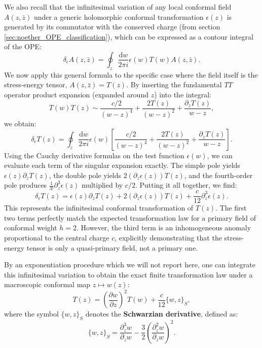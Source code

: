 We also recall that the infinitesimal variation of any local conformal field \(A(z, \bar{z})\) under a generic holomorphic conformal transformation \(\epsilon(z)\) is generated by its commutator with the conserved charge (from section \ref{sec:noether_OPE_classification}), which can be expressed as a contour integral of the OPE:
\[
    \delta_\epsilon A(z, \bar{z}) = \oint_z \frac{\mathrm{d} w}{2\pi i} \epsilon(w) T(w) A(z, \bar{z}).
\]
We now apply this general formula to the specific case where the field itself is the stress-energy tensor, \(A(z, \bar{z}) = T(z)\). By inserting the fundamental \(TT\) operator product expansion (expanded around \(z\)) into the integral:
\[
    T(w)T(z) \sim \frac{c/2}{(w - z)^4} + \frac{2T(z)}{(w - z)^2} + \frac{\partial_z T(z)}{w - z},
\]
we obtain:
\[
    \delta_\epsilon T(z) = \oint_z \frac{\mathrm{d} w}{2\pi i} \epsilon(w) \left[ \frac{c/2}{(w - z)^4} + \frac{2T(z)}{(w - z)^2} + \frac{\partial_z T(z)}{w - z} \right].
\]
Using the Cauchy derivative formulas on the test function \(\epsilon(w)\), we can evaluate each term of the singular expansion exactly. The simple pole yields \(\epsilon(z) \partial_z T(z)\), the double pole yields \(2 (\partial_z \epsilon(z)) T(z)\), and the fourth-order pole produces \(\frac{1}{3!} \partial_z^3 \epsilon(z)\) multiplied by \(c/2\). Putting it all together, we find:
\[
    \delta_\epsilon T(z) = \epsilon(z)\partial_z T(z) + 2(\partial_z \epsilon(z))T(z) + \frac{c}{12}\partial_z^3 \epsilon(z).
\]
This represents the infinitesimal conformal transformation of \(T(z)\). The first two terms perfectly match the expected transformation law for a primary field of conformal weight \(h = 2\). However, the third term is an inhomogeneous anomaly proportional to the central charge \(c\), explicitly demonstrating that the stress-energy tensor is only a quasi-primary field, not a primary one.

By an exponentiation procedure which we will not report here, one can integrate this infinitesimal variation to obtain the exact finite transformation law under a macroscopic conformal map \(z \mapsto w(z)\):
\[
    T(z) = \left(\frac{\partial w}{\partial z}\right)^2 T(w) + \frac{c}{12} \{w, z\}_S,
\]
where the symbol \(\{w, z\}_S\) denotes the \textbf{Schwarzian derivative}, defined as:
\[
    \{w, z\}_S = \frac{\partial_z^3 w}{\partial_z w} - \frac{3}{2} \left( \frac{\partial_z^2 w}{\partial_z w} \right)^2.
\]

